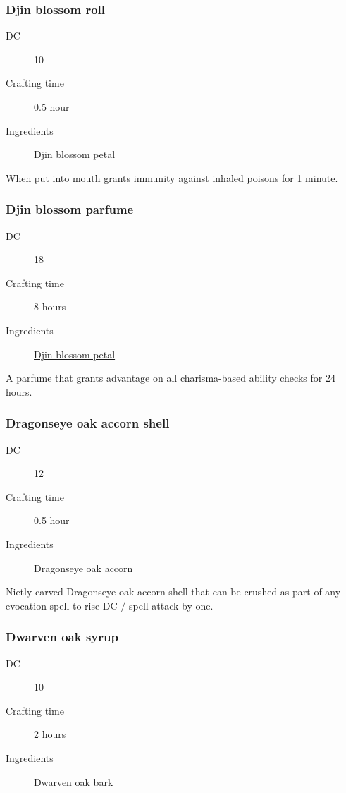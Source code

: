 \subsubsection{Djin blossom roll}
\label{Djin blossom roll}

\begin{description}
\item [DC] 10
\item [Crafting time] 0.5 hour
\item [Ingredients] \hyperref[Djin Blossom]{Djin blossom petal}
\end{description}

When put into mouth grants immunity against inhaled poisons for 1 minute.

\subsubsection{Djin blossom parfume}

\begin{description}
\item [DC] 18
\item [Crafting time] 8 hours
\item [Ingredients] \hyperref[Djin Blossom]{Djin blossom petal}
\end{description}

A parfume that grants advantage on all charisma-based ability checks for 24 hours.

\subsubsection{Dragonseye oak accorn shell}
\label{Dragonseye oak accorn shell}

\begin{description}
\item [DC] 12
\item [Crafting time] 0.5 hour
\item [Ingredients] Dragonseye oak accorn
\end{description}

Nietly carved Dragonseye oak accorn shell that can be crushed as part of any evocation spell to rise DC / spell attack by one.

\subsubsection{Dwarven oak syrup}
\label{Dwarven oak syrup}

\begin{description}
\item [DC] 10
\item [Crafting time] 2 hours
\item [Ingredients] \hyperref[Dwarven Oak]{Dwarven oak bark}
\end{description}

